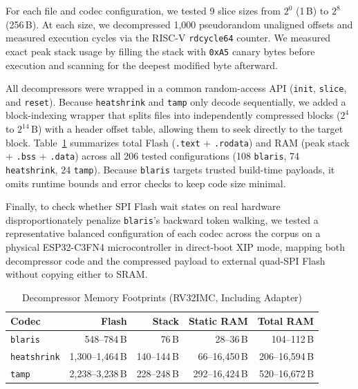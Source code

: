 \documentclass[10pt,twocolumn]{article}
\newcommand{\code}[1]{\texttt{#1}}
\begin{document}
For each file and codec configuration, we tested 9 slice sizes from $2^0$ (1\,B)
to $2^8$ (256\,B). At each size, we decompressed 1,000 pseudorandom unaligned
offsets and measured execution cycles via the RISC-V \code{rdcycle64} counter.
We measured exact peak stack usage by filling the stack with \code{0xA5} canary
bytes before execution and scanning for the deepest modified byte afterward.

All decompressors were wrapped in a common random-access API
(\code{init}, \code{slice}, and \code{reset}). Because \code{heatshrink} and
\code{tamp} only decode sequentially, we added a block-indexing wrapper that
splits files into independently compressed blocks ($2^4$ to $2^{14}$\,B) with a
header offset table, allowing them to seek directly to the target block.
Table~\ref{tab:memory} summarizes total Flash (\code{.text} + \code{.rodata})
and RAM (peak stack + \code{.bss} + \code{.data}) across all 206 tested
configurations (108 \code{blaris}, 74 \code{heatshrink}, 24 \code{tamp}).
Because \code{blaris} targets trusted build-time payloads, it omits runtime
bounds and error checks to keep code size minimal.

Finally, to check whether SPI Flash wait states on real hardware
disproportionately penalize \code{blaris}'s backward token walking, we tested a
representative balanced configuration of each codec across the corpus on a
physical ESP32-C3FN4 microcontroller in direct-boot XIP mode, mapping both
decompressor code and the compressed payload to external quad-SPI Flash without
copying either to SRAM.

\begin{table}[!t]
\centering
\caption{Decompressor Memory Footprints (RV32IMC, Including Adapter)}
\label{tab:memory}
\footnotesize
\renewcommand{\arraystretch}{1.15}
\setlength{\tabcolsep}{2.4pt}
\begin{tabular}{@{}l r r r r@{}}
\toprule
\textbf{Codec} & \textbf{Flash} & \textbf{Stack} & \textbf{Static RAM} & \textbf{Total RAM} \\
\midrule
\code{blaris}     &   548--784\,B   &      76\,B &    28--36\,B      &   104--112\,B \\
\code{heatshrink} & 1,300--1,464\,B & 140--144\,B &    66--16,450\,B &   206--16,594\,B \\
\code{tamp}       & 2,238--3,238\,B & 228--248\,B &   292--16,424\,B &   520--16,672\,B \\
\bottomrule
\end{tabular}
\end{table}
\end{document}
